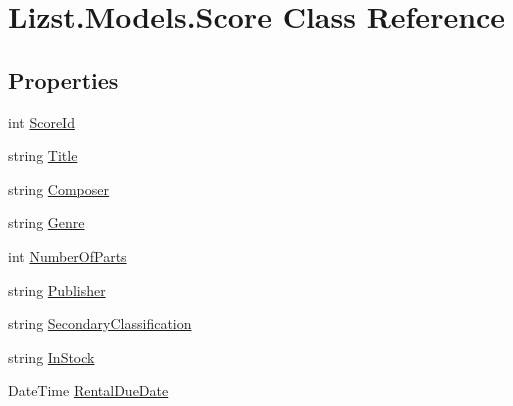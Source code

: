 \hypertarget{class_lizst_1_1_models_1_1_score}{}\section{Lizst.\+Models.\+Score Class Reference}
\label{class_lizst_1_1_models_1_1_score}
\subsection*{Properties}
\begin{DoxyCompactItemize}
\item 
int \mbox{\hyperlink{class_lizst_1_1_models_1_1_score_a749785856a6ce8d4b38ce5c1ff2ca4a5}{Score\+Id}}
\item 
string \mbox{\hyperlink{class_lizst_1_1_models_1_1_score_a5df567b6594f1cf21822a3db5349cb69}{Title}}
\item 
string \mbox{\hyperlink{class_lizst_1_1_models_1_1_score_afd487f58e8d3827bda64ea33785e9746}{Composer}}
\item 
string \mbox{\hyperlink{class_lizst_1_1_models_1_1_score_aa75d77de7a6fb54ff5e18609607c6785}{Genre}}
\item 
int \mbox{\hyperlink{class_lizst_1_1_models_1_1_score_a0021cbce26e5225308f31dc05b379aca}{Number\+Of\+Parts}}
\item 
string \mbox{\hyperlink{class_lizst_1_1_models_1_1_score_ace5bba65cfd84cf913ab7cc06b26b16f}{Publisher}}
\item 
string \mbox{\hyperlink{class_lizst_1_1_models_1_1_score_aa6f65abd4bd6b3aadcf344a16b3460cd}{Secondary\+Classification}}
\item 
string \mbox{\hyperlink{class_lizst_1_1_models_1_1_score_a693123d99299051dc63d5e3f818a0865}{In\+Stock}}
\item 
Date\+Time \mbox{\hyperlink{class_lizst_1_1_models_1_1_score_ab730dea40165dce9f9b3ca8502ce9c82}{Rental\+Due\+Date}}
\end{DoxyCompactItemize}


